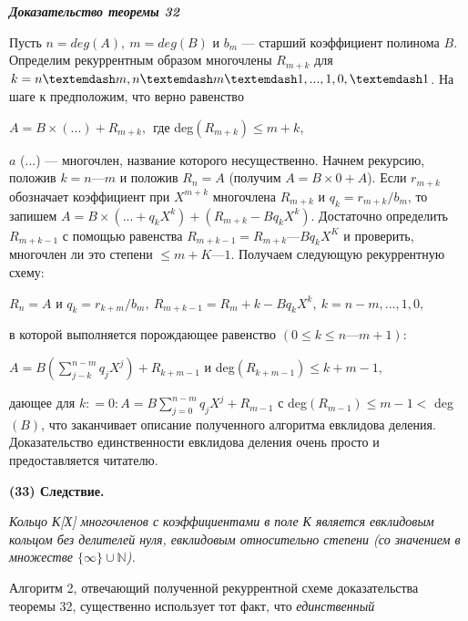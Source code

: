 \documentclass{mai_book}
\begin{document}
\noindent\textbf{\textit{Доказательство теоремы 32}}

Пусть $n = deg(A),\: m = deg(B)$ и $b_m$ — старший коэффициент  
полинома $B$. Определим рекуррентным образом многочлены $R_{m+k}$ для 
$k = n — m, n — m — 1,\newline ..., 1,0, —1$. На шаге к предположим, что верно 
равенство

\begin{center}
$A = B \times (...) + R_{m+k},\:\:$где deg$(R_{m+k}) \leq m + k$,
\end{center} 
\pagebreak

\noindent$a$ (...) — многочлен, название которого несущественно. Начнем  
рекурсию, положив $k = n — m$ и положив $R_n = A$ (получим $A = B \times 0 + A$). 
Если $r_{m+k}$ обозначает коэффициент при $X^{m+k}$ многочлена $R_{m+k}$ и 
$q_k = r_{m+k}\slash b_m$, то запишем $A = B\times (... + q_kX^k) + (R_{m+k} - Bq_kX^k)$.  
Достаточно определить $R_{m+k-1}$ с помощью равенства $R_{m+k-1} = R_{m+k} — 
Bq_kX^K$ и проверить, многочлен ли это степени $\leq m + K — 1$. Получаем 
следующую рекуррентную схему:

\begin{center}
\noindent$R_n = A$ и $q_k = r_{k+m}\slash b_m,\: R_{m+k-1}=R_m+k - Bq_kX^k,\: k = n-m,...,1,0,$
\end{center}

\noindent в которой выполняется порождающее равенство $(0 \leq k \leq n — m + 1)$: 

\begin{center}
$A = B\left(\sum_{j-k}^{n-m}q_jX^j\right)+R_{k+m-1}$ и deg$(R_{k+m-1})\leq k+m-1,$
\end{center}

\noindent дающее для $k: = 0: A =B\sum_{j=0}^{n-m}q_jX^j + R_{m-1}$ с deg$(R_{m-1}) \leq m - 1 <$ 
deg$(B)$, что заканчивает описание полученного алгоритма евклидова 
деления. Доказательство единственности евклидова деления очень  
просто и предоставляется читателю. 

\noindent\textbf{(33) Следствие.}

\textit{Кольцо К[Х] многочленов с коэффициентами в поле К является  
евклидовым кольцом без делителей нуля, евклидовым относительно  
степени (со значением в множестве $\{\infty\}\cup \mathbb{N}$).}\newline

Алгоритм 2, отвечающий полученной рекуррентной схеме  
доказательства теоремы 32, существенно использует тот факт, что \textit{единственный}
\pagebreak
\end{document}
